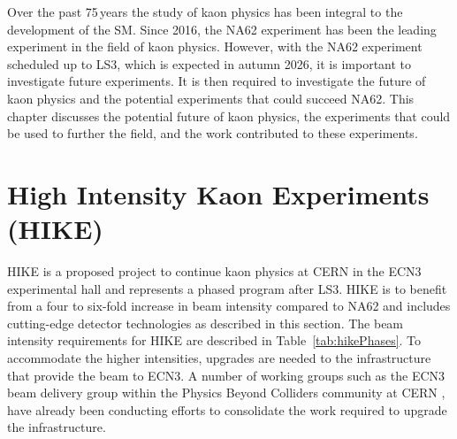 \documentclass[../../main.tex]{subfiles}
\begin{document}
    \glsresetall
    Over the past 75\,years the study of kaon physics has been integral to the development of the \gls{SM}. Since 2016, the NA62 experiment has been the leading experiment in the field of kaon physics. However, 
    with the NA62 experiment scheduled up to \gls{LS3}, which is expected in autumn 2026, it is important to investigate future experiments. It is then required to investigate the future of kaon physics and the potential experiments that could succeed NA62. This chapter discusses the potential future of kaon physics, the experiments that could be used to further the field, and the 
    work contributed to these experiments.
    \section[HIKE]{High Intensity Kaon Experiments (HIKE)}
    \gls{HIKE} is a proposed project to continue kaon physics at CERN in the ECN3 experimental hall and represents a phased program after LS3. HIKE is to benefit from a four to six-fold increase in beam intensity compared to NA62 and includes cutting-edge detector technologies as described in this 
    section. The beam intensity requirements for HIKE are described in Table~\ref{tab:hikePhases}. To accommodate the higher intensities, upgrades are needed to the infrastructure that provide the beam to ECN3. A number of working groups such as the ECN3 beam delivery group within the Physics Beyond Colliders community at CERN \cite{Gatignon:2650989}, have already been conducting efforts to consolidate the work required to upgrade the infrastructure.
    
\end{document}
